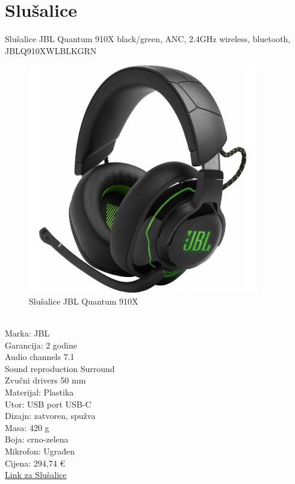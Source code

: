 \documentclass{article}
\begin{document}
\section{Slušalice}
Slušalice JBL Quantum 910X black/green, ANC, 2.4GHz wireless, bluetooth, JBLQ910XWLBLKGRN
\begin{figure}[h]
    \includegraphics[width=10cm]{slusalice.jpg}
    \caption{Slušalice JBL Quantum 910X}
\end{figure}\\
Marka: JBL\\
Garancija: 2 godine\\
Audio channels 7.1\\
Sound reproduction Surround\\
Zvučni drivers 50 mm\\
Materijal: Plastika\\
Utor: USB port USB-C\\
Dizajn: zatvoren, spužva\\
Masa: 420 g\\
Boja: crno-zelena\\
Mikrofon: Ugrađen\\
Cijena: 294,74 €\\
\href{https://www.adm.hr/jbl-quantum-910p-white-blue-wireless-jblq910pwlwhtblu/76767/product/}{Link za Slušalice}
\newpage
\end{document}
